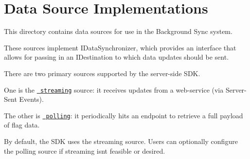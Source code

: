 \chapter{Data Source Implementations}
\hypertarget{md_src_2data__systems_2background__sync_2sources_2README}{}\label{md_src_2data__systems_2background__sync_2sources_2README}
\label{md_src_2data__systems_2background__sync_2sources_2README_autotoc_md1}%
%
 This directory contains data sources for use in the Background Sync system.

These sources implement {\ttfamily IData\+Synchronizer}, which provides an interface that allows for passing in an {\ttfamily IDestination} to which data updates should be sent.

There are two primary sources supported by the server-\/side SDK.

One is the \href{./streaming}{\texttt{ streaming}} source\+: it receives updates from a web-\/service (via Server-\/\+Sent Events).

The other is \href{./polling}{\texttt{ polling}}\+: it periodically hits an endpoint to retrieve a full payload of flag data.

By default, the SDK uses the streaming source. Users can optionally configure the polling source if streaming isn\textquotesingle{}t feasible or desired. 